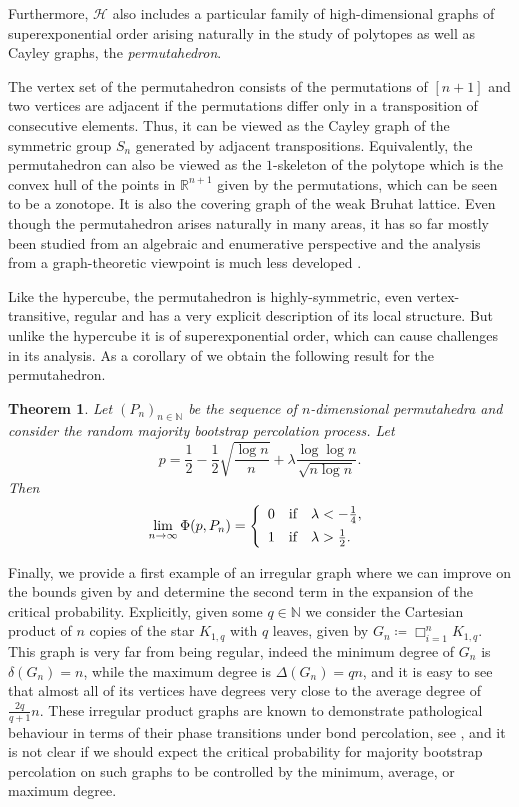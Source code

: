 \documentclass[reqno,a4paper,11pt]{amsart}
\newtheorem{theorem}{Theorem}[section]
\theoremstyle{definition}
\newcommand{\car}{\mathbin{\Box}}
\begin{document}
Furthermore, $\mathcal{H}$ also includes a particular family of high-dimensional graphs of superexponential order arising naturally in the study of polytopes as well as Cayley graphs, the \emph{permutahedron}.

The vertex set of the permutahedron consists of the permutations of $[n+1]$ and two vertices are adjacent if the permutations differ only in a transposition of consecutive elements.
Thus, it can be viewed as the Cayley graph of the symmetric group $S_n$ generated by adjacent transpositions.
Equivalently, the permutahedron can also be viewed as the $1$-skeleton of the polytope which is the convex hull of the points in $\mathbb{R}^{n+1}$ given by the permutations, which can be seen to be a zonotope.
It is also the covering graph of the weak Bruhat lattice.
Even though the permutahedron arises naturally in many areas, it has so far mostly been studied from an algebraic and enumerative perspective and the analysis from a graph-theoretic viewpoint is much less developed \cite{CDE24}.

Like the hypercube, the permutahedron is highly-symmetric, even vertex-transitive, regular and has a very explicit description of its local structure.
But unlike the hypercube it is of superexponential order, which can cause challenges in its analysis.
As a corollary of  we obtain the following result for the permutahedron.

\begin{theorem}\label{t:permutahedron}
  Let $(P_n)_{n \in \mathbb{N}}$ be the sequence of $n$-dimensional permutahedra and consider the random majority bootstrap percolation process.
  Let
  \[
    p = \frac{1}{2}-\frac{1}{2} \sqrt{\frac{\log n}{n}}+ \lambda \frac{\log \log n}{\sqrt{n \log n}}.
  \]
  Then
  \[
    \lim_{n \to \infty} \Phi(p, P_n) = \left\{
      \begin{array} {c@{\quad \textup{if} \quad}l}
        0 & \lambda < -\frac{1}{4}, \\[+1ex]
        1 & \lambda > \frac{1}{2}.
      \end{array}\right.
  \]
\end{theorem}
\smallskip

Finally, we provide a first example of an irregular graph where we can improve on the bounds given by  and determine the second term in the expansion of the critical probability.
Explicitly, given some $q \in \mathbb{N}$ we consider the Cartesian product of $n$ copies of the star $K_{1, q}$ with $q$ leaves, given by $G_n \coloneqq \car_{i=1}^n K_{1, q}$.
This graph is very far from being regular, indeed the minimum degree of $G_n$ is $\delta(G_n)=n$, while the maximum degree is $\Delta(G_n)=qn$, and it is easy to see that almost all of its vertices have degrees very close to the average degree of $\frac{2q}{q+1}n$.
These irregular product graphs are known to demonstrate pathological behaviour in terms of their phase transitions under bond percolation, see \cite{CDE24,diskin2022Irregular}, and it is not clear if we should expect the critical probability for majority bootstrap percolation on such graphs to be controlled by the minimum, average, or maximum degree.
\end{document}

